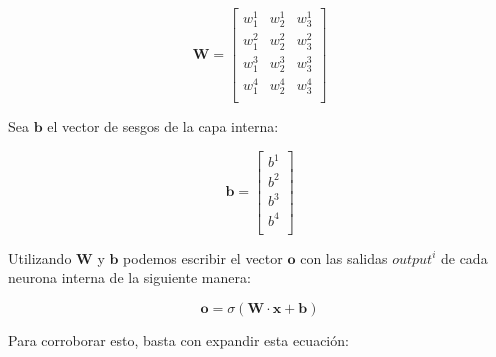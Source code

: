 \documentclass[a4paper, 10pt, twoside]{article}
\begin{document}
$$
\bm{W} =
\begin{bmatrix}
  w_1^1 & w_2^1 & w_3^1 \\
  w_1^2 & w_2^2 & w_3^2 \\
  w_1^3 & w_2^3 & w_3^3 \\
  w_1^4 & w_2^4 & w_3^4 \\
\end{bmatrix}
$$

Sea $\bm{b}$ el vector de sesgos de la capa interna:

$$
\bm{b} =
\begin{bmatrix}
  b^1 \\
  b^2 \\
  b^3 \\
  b^4 \\
\end{bmatrix}
$$

Utilizando $\bm{W}$ y $\bm{b}$ podemos escribir el vector $\bm{o}$ con las
salidas $\mathit{output}^i$ de cada neurona interna de la siguiente manera:

$$
\bm{o} = \sigma(\bm{W} \cdot \bm{x} + \bm{b})
$$

Para corroborar esto, basta con expandir esta ecuación:
\end{document}
